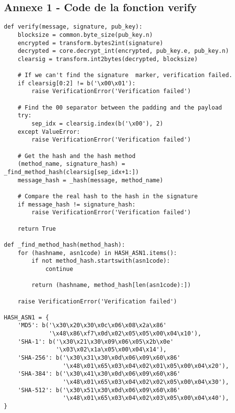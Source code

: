 \documentclass[a4,12pt]{article}
\begin{document}
\subsection{Annexe 1 - Code de la fonction verify}\label{annexe_1}
\begin{lstlisting}
def verify(message, signature, pub_key):  
    blocksize = common.byte_size(pub_key.n)
    encrypted = transform.bytes2int(signature)
    decrypted = core.decrypt_int(encrypted, pub_key.e, pub_key.n)
    clearsig = transform.int2bytes(decrypted, blocksize)

    # If we can't find the signature  marker, verification failed.
    if clearsig[0:2] != b('\x00\x01'):
        raise VerificationError('Verification failed')

    # Find the 00 separator between the padding and the payload
    try:
        sep_idx = clearsig.index(b('\x00'), 2)
    except ValueError:
        raise VerificationError('Verification failed')

    # Get the hash and the hash method
    (method_name, signature_hash) = _find_method_hash(clearsig[sep_idx+1:])
    message_hash = _hash(message, method_name)

    # Compare the real hash to the hash in the signature
    if message_hash != signature_hash:
        raise VerificationError('Verification failed')

    return True

def _find_method_hash(method_hash):  
    for (hashname, asn1code) in HASH_ASN1.items():
        if not method_hash.startswith(asn1code):
            continue

        return (hashname, method_hash[len(asn1code):])

    raise VerificationError('Verification failed')

HASH_ASN1 = {  
    'MD5': b('\x30\x20\x30\x0c\x06\x08\x2a\x86'
             '\x48\x86\xf7\x0d\x02\x05\x05\x00\x04\x10'),
    'SHA-1': b('\x30\x21\x30\x09\x06\x05\x2b\x0e'
               '\x03\x02\x1a\x05\x00\x04\x14'),
    'SHA-256': b('\x30\x31\x30\x0d\x06\x09\x60\x86'
                 '\x48\x01\x65\x03\x04\x02\x01\x05\x00\x04\x20'),
    'SHA-384': b('\x30\x41\x30\x0d\x06\x09\x60\x86'
                 '\x48\x01\x65\x03\x04\x02\x02\x05\x00\x04\x30'),
    'SHA-512': b('\x30\x51\x30\x0d\x06\x09\x60\x86'
                 '\x48\x01\x65\x03\x04\x02\x03\x05\x00\x04\x40'),
}
\end{lstlisting}
\end{document}
